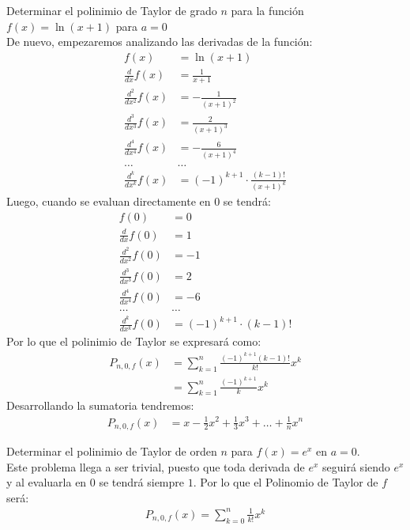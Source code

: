 \documentclass[12pt,a4paper,oneside]{memoir}
\begin{document}
\begin{problem}
    Determinar el polinimio de Taylor de grado $n$ para la función $f(x) = \ln(x+1)$ para $a = 0$\\

    De nuevo, empezaremos analizando las derivadas de la función:
    \begin{align*}
        f(x) &= \ln(x+1)\\
        \frac{d}{dx} f(x) &= \frac{1}{x+1}\\
        \frac{d^2}{dx^2} f(x) &= -\frac{1}{(x+1)^2}\\
        \frac{d^3}{dx^3} f(x) &= \frac{2}{(x+1)^3}\\
        \frac{d^4}{dx^4} f(x) &= -\frac{6}{(x+1)^4}\\
        \dots & \dots\\
        \frac{d^k}{dx^k} f(x) &= (-1)^{k+1} \cdot \frac{(k-1)!}{(x+1)^k}
    \end{align*}
    Luego, cuando se evaluan directamente en $0$ se tendrá:
    \begin{align*}
        f(0) &= 0\\
        \frac{d}{dx} f(0) &= 1\\
        \frac{d^2}{dx^2} f(0) &= -1\\
        \frac{d^3}{dx^3} f(0) &= 2\\
        \frac{d^4}{dx^4} f(0) &= -6\\
        \dots & \dots\\
        \frac{d^k}{dx^k} f(0) &= (-1)^{k+1} \cdot (k-1)!
    \end{align*}
    Por lo que el polinimio de Taylor se expresará como:
    \begin{align*}
        P_{n, 0, f}(x) &= \sum_{k = 1}^n \frac{(-1)^{k+1} (k-1)!}{k!} x^k\\
        &= \sum_{k = 1}^n \frac{(-1)^{k+1}}{k} x^k
    \end{align*}
    Desarrollando la sumatoria tendremos:
    \begin{align*}
        P_{n, 0, f}(x) &= x - \frac{1}{2}x^2 + \frac{1}{3}x^3 + \dots + \frac{1}{n} x^n 
    \end{align*}
\end{problem}

\begin{problem}
    Determinar el polinimio de Taylor de orden $n$ para $f(x) = e^x$ en $a = 0$.\\

    Este problema llega a ser trivial, puesto que toda derivada de $e^x$ seguirá siendo $e^x$ y al evaluarla en $0$ se tendrá siempre $1$. Por lo que el Polinomio de Taylor de $f$ será:
    \begin{align*}
        P_{n, 0, f}(x) = \sum_{k = 0}^n \frac{1}{k!} x^k\\
    \end{align*}
\end{problem}
\end{document}
